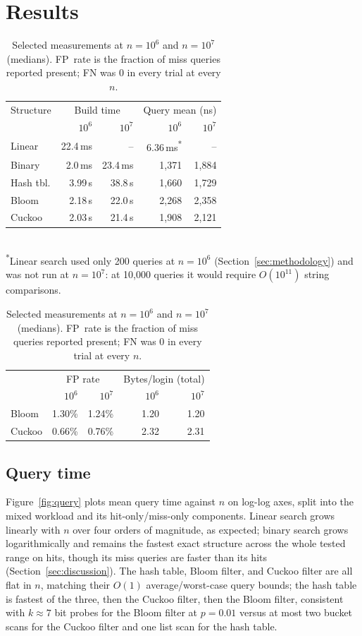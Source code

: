 \documentclass[acmsmall,screen,nonacm=true]{acmart}
\begin{document}
\section{Results}
\label{sec:results}

\begin{table}[t]
\caption{Selected measurements at $n=10^6$ and $n=10^7$ (medians).
FP~rate is the fraction of miss queries reported present; FN was 0 in
every trial at every $n$.}
\label{tab:results}
\begin{tabular}{lrrrr}
\toprule
Structure & \multicolumn{2}{c}{Build time} & \multicolumn{2}{c}{Query mean (ns)} \\
 & $10^6$ & $10^7$ & $10^6$ & $10^7$ \\
\midrule
Linear   & 22.4\,ms  & --      & 6.36\,ms\textsuperscript{*} & -- \\
Binary   & 2.0\,ms   & 23.4\,ms  & 1{,}371 & 1{,}884 \\
Hash tbl.& 3.99\,s   & 38.8\,s & 1{,}660 & 1{,}729 \\
Bloom    & 2.18\,s   & 22.0\,s & 2{,}268 & 2{,}358 \\
Cuckoo   & 2.03\,s   & 21.4\,s & 1{,}908 & 2{,}121 \\
\bottomrule
\end{tabular}
\\[2pt]
\footnotesize
\textsuperscript{*}Linear search used only 200 queries at $n=10^6$
(Section~\ref{sec:methodology}) and was not run at $n=10^7$: at 10{,}000
queries it would require $O(10^{11})$ string comparisons.
\begin{tabular}{lrrrr}
& \multicolumn{2}{c}{FP rate} & \multicolumn{2}{c}{Bytes/login (total)} \\
& $10^6$ & $10^7$ & $10^6$ & $10^7$ \\
\midrule
Bloom  & 1.30\% & 1.24\% & 1.20 & 1.20 \\
Cuckoo & 0.66\% & 0.76\% & 2.32 & 2.31 \\
\bottomrule
\end{tabular}
\end{table}

\subsection{Query time}
Figure~\ref{fig:query} plots mean query time against $n$ on log-log axes,
split into the mixed workload and its hit-only/miss-only components.
Linear search grows linearly with $n$ over four orders of magnitude, as
expected; binary search grows logarithmically and remains the fastest exact
structure across the whole tested range on hits, though its miss queries
are faster than its hits (Section~\ref{sec:discussion}). The hash table,
Bloom filter, and Cuckoo filter are all flat in $n$, matching their $O(1)$
average/worst-case query bounds; the hash table is fastest of the three,
then the Cuckoo filter, then the Bloom filter, consistent with $k\approx 7$
bit probes for the Bloom filter at $p=0.01$ versus at most two bucket scans
for the Cuckoo filter and one list scan for the hash table.
\label{sec:results-linear}
\end{document}
